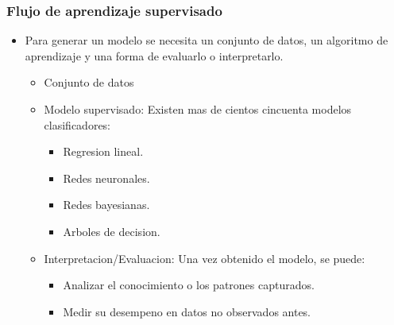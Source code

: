 \documentclass[11pt]{article}
\begin{document}
\subsubsection{Flujo de aprendizaje supervisado}
\label{sec:org1bb89bb}
\begin{itemize}
\item Para generar un modelo se necesita un conjunto de datos, un algoritmo de aprendizaje y una forma de evaluarlo o interpretarlo.
\begin{itemize}
\item Conjunto de datos
\item Modelo supervisado: Existen mas de cientos cincuenta modelos clasificadores:
\begin{itemize}
\item Regresion lineal.
\item Redes neuronales.
\item Redes bayesianas.
\item Arboles de decision.
\end{itemize}
\item Interpretacion/Evaluacion: Una vez obtenido el modelo, se puede:
\begin{itemize}
\item Analizar el conocimiento o los patrones capturados.
\item Medir su desempeno en datos no observados antes.
\end{itemize}
\end{itemize}
\end{itemize}
\end{document}
